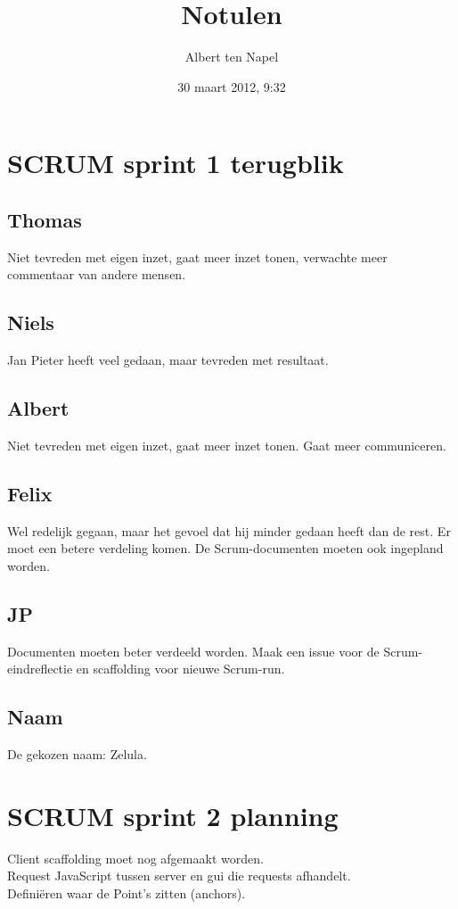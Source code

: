 \documentclass{article}
\begin{document}
\title{Notulen}
\author{Albert ten Napel}
\date{30 maart 2012, 9:32}

\maketitle

\section{SCRUM sprint 1 terugblik}
\subsection*{Thomas}
Niet tevreden met eigen inzet, gaat meer inzet tonen, verwachte meer commentaar van andere mensen.
\subsection*{Niels}
Jan Pieter heeft veel gedaan, maar tevreden met resultaat.
\subsection*{Albert}
Niet tevreden met eigen inzet, gaat meer inzet tonen. Gaat meer communiceren.
\subsection*{Felix}
Wel redelijk gegaan, maar het gevoel dat hij minder gedaan heeft dan de rest. Er moet een betere verdeling komen. De Scrum-documenten moeten ook ingepland worden.
\subsection*{JP}
Documenten moeten beter verdeeld worden. Maak een issue voor de Scrum-eindreflectie en scaffolding voor nieuwe Scrum-run.

\subsection*{Naam}
De gekozen naam: Zelula.

\section{SCRUM sprint 2 planning}
Client scaffolding moet nog afgemaakt worden.\\
Request JavaScript tussen server en gui die requests afhandelt.\\
Definiëren waar de Point's zitten (anchors).
\end{document}
